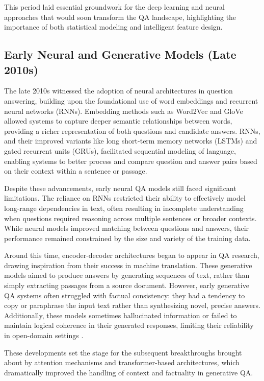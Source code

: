 \begin{spacing}{1.5}
This period laid essential groundwork for the deep learning and neural approaches that would soon transform the QA landscape, highlighting the importance of both statistical modeling and intelligent feature design.

\subsection{Early Neural and Generative Models (Late 2010s)}
The late 2010s witnessed the adoption of neural architectures in question answering, building upon the foundational use of word embeddings and recurrent neural networks (RNNs). Embedding methods such as Word2Vec \citep{mikolov_efficient_2013} and GloVe \citep{pennington_glove_2014} allowed systems to capture deeper semantic relationships between words, providing a richer representation of both questions and candidate answers. RNNs, and their improved variants like long short-term memory networks (LSTMs) and gated recurrent units (GRUs), facilitated sequential modeling of language, enabling systems to better process and compare question and answer pairs based on their context within a sentence or passage.

Despite these advancements, early neural QA models still faced significant limitations. The reliance on RNNs restricted their ability to effectively model long-range dependencies in text, often resulting in incomplete understanding when questions required reasoning across multiple sentences or broader contexts. While neural models improved matching between questions and answers, their performance remained constrained by the size and variety of the training data.

Around this time, encoder-decoder architectures began to appear in QA research, drawing inspiration from their success in machine translation. These generative models aimed to produce answers by generating sequences of text, rather than simply extracting passages from a source document. However, early generative QA systems often struggled with factual consistency: they had a tendency to copy or paraphrase the input text rather than synthesizing novel, precise answers. Additionally, these models sometimes hallucinated information or failed to maintain logical coherence in their generated responses, limiting their reliability in open-domain settings \citep{caballero_brief_2021}.

These developments set the stage for the subsequent breakthroughs brought about by attention mechanisms and transformer-based architectures, which dramatically improved the handling of context and factuality in generative QA.


\end{spacing}
